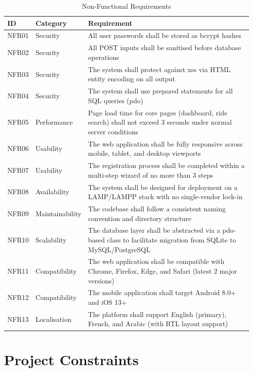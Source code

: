 \documentclass[12pt,a4paper,openright]{report}
\begin{document}
\begin{table}[H]
\centering
\caption{Non-Functional Requirements}
\label{tab:nonfunc-req}
\begin{tabularx}{\textwidth}{l l X}
\toprule
\textbf{ID} & \textbf{Category} & \textbf{Requirement} \\
\midrule
NFR01 & Security & All user passwords shall be stored as bcrypt hashes \\
NFR02 & Security & All POST inputs shall be sanitised before database operations \\
NFR03 & Security & The system shall protect against \gls{xss} via HTML entity encoding on all output \\
NFR04 & Security & The system shall use prepared statements for all SQL queries (\gls{pdo}) \\
NFR05 & Performance & Page load time for core pages (dashboard, ride search) shall not exceed 3 seconds under normal server conditions \\
NFR06 & Usability & The web application shall be fully responsive across mobile, tablet, and desktop viewports \\
NFR07 & Usability & The registration process shall be completed within a multi-step wizard of no more than 3 steps \\
NFR08 & Availability & The system shall be designed for deployment on a LAMP/LAMPP stack with no single-vendor lock-in \\
NFR09 & Maintainability & The codebase shall follow a consistent naming convention and directory structure \\
NFR10 & Scalability & The database layer shall be abstracted via a \gls{pdo}-based class to facilitate migration from SQLite to MySQL/PostgreSQL \\
NFR11 & Compatibility & The web application shall be compatible with Chrome, Firefox, Edge, and Safari (latest 2 major versions) \\
NFR12 & Compatibility & The mobile application shall target Android 8.0+ and iOS 13+ \\
NFR13 & Localisation & The platform shall support English (primary), French, and Arabic (with RTL layout support) \\
\bottomrule
\end{tabularx}
\end{table}

\section{Project Constraints}
\end{document}

